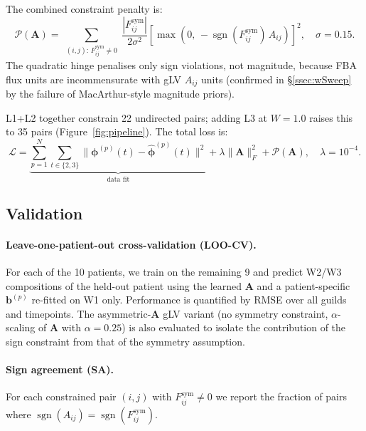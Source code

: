 \documentclass[11pt,a4paper]{article}
\newcommand{\bphi}{\boldsymbol{\phi}}
\newcommand{\bA}{\mathbf{A}}
\newcommand{\bb}{\mathbf{b}}
\newcommand{\sgn}{\operatorname{sgn}}
\begin{document}
The combined constraint penalty is:
\begin{equation}
  \mathcal{P}(\bA) = \sum_{\substack{(i,j):\, F^\text{sym}_{ij} \neq 0}}
    \frac{|F^\text{sym}_{ij}|}{2\sigma^2}
    \left[\max\!\left(0,\,-\sgn(F^\text{sym}_{ij})\,A_{ij}\right)\right]^2,
  \quad \sigma = 0.15.
  \label{eq:penalty}
\end{equation}
The quadratic hinge penalises only sign violations, not magnitude, because
FBA flux units are incommensurate with gLV $A_{ij}$ units (confirmed in
§\ref{ssec:wSweep} by the failure of MacArthur-style magnitude priors).

L1+L2 together constrain 22 undirected pairs; adding L3 at $W{=}1.0$ raises
this to 35 pairs (Figure~\ref{fig:pipeline}).
The total loss is:
\begin{equation}
  \mathcal{L} = \underbrace{\sum_{p=1}^{N}\sum_{t\in\{2,3\}} \|\bphi^{(p)}(t) -
    \hat{\bphi}^{(p)}(t)\|^2}_{\text{data fit}}
    + \lambda \|\bA\|_F^2
    + \mathcal{P}(\bA),
  \quad \lambda = 10^{-4}.
  \label{eq:loss}
\end{equation}

\subsection{Validation}
\label{ssec:validation}

\paragraph{Leave-one-patient-out cross-validation (LOO-CV).}
For each of the 10 patients, we train on the remaining 9 and predict W2/W3
compositions of the held-out patient using the learned $\bA$ and a
patient-specific $\bb^{(p)}$ re-fitted on W1 only.
Performance is quantified by RMSE over all guilds and timepoints.
The asymmetric-$\bA$ gLV variant (no symmetry constraint, $\alpha$-scaling
of $\bA$ with $\alpha=0.25$) is also evaluated to isolate the contribution
of the sign constraint from that of the symmetry assumption.

\paragraph{Sign agreement (SA).}
For each constrained pair $(i,j)$ with $F^\text{sym}_{ij}\neq 0$ we report
the fraction of pairs where $\sgn(A_{ij}) = \sgn(F^\text{sym}_{ij})$.
\end{document}

